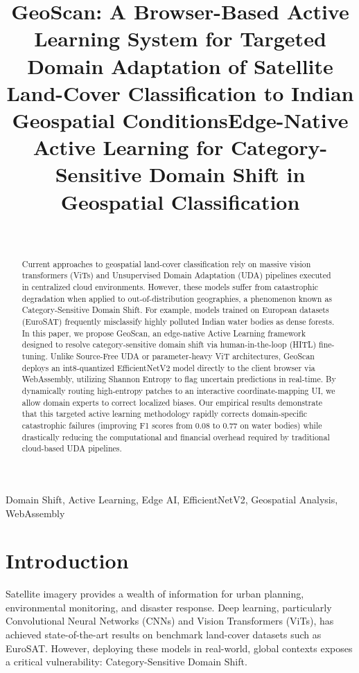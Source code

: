 \documentclass[journal]{IEEEtran}
\title{\textbf{GeoScan: A Browser-Based Active Learning System for Targeted Domain
Adaptation of Satellite Land-Cover Classification to Indian Geospatial
Conditions}}
\date{}
\begin{document}
\title{Edge-Native Active Learning for Category-Sensitive Domain Shift in Geospatial Classification}
\author{\\
}

\maketitle

\begin{abstract}
Current approaches to geospatial land-cover classification rely on massive vision transformers (ViTs) and Unsupervised Domain Adaptation (UDA) pipelines executed in centralized cloud environments. However, these models suffer from catastrophic degradation when applied to out-of-distribution geographies, a phenomenon known as Category-Sensitive Domain Shift. For example, models trained on European datasets (EuroSAT) frequently misclassify highly polluted Indian water bodies as dense forests. In this paper, we propose GeoScan, an edge-native Active Learning framework designed to resolve category-sensitive domain shift via human-in-the-loop (HITL) fine-tuning. Unlike Source-Free UDA or parameter-heavy ViT architectures, GeoScan deploys an int8-quantized EfficientNetV2 model directly to the client browser via WebAssembly, utilizing Shannon Entropy to flag uncertain predictions in real-time. By dynamically routing high-entropy patches to an interactive coordinate-mapping UI, we allow domain experts to correct localized biases. Our empirical results demonstrate that this targeted active learning methodology rapidly corrects domain-specific catastrophic failures (improving F1 scores from 0.08 to 0.77 on water bodies) while drastically reducing the computational and financial overhead required by traditional cloud-based UDA pipelines.
\end{abstract}

\begin{IEEEkeywords}
Domain Shift, Active Learning, Edge AI, EfficientNetV2, Geospatial Analysis, WebAssembly
\end{IEEEkeywords}

\section{Introduction}
Satellite imagery provides a wealth of information for urban planning, environmental monitoring, and disaster response. Deep learning, particularly Convolutional Neural Networks (CNNs) and Vision Transformers (ViTs), has achieved state-of-the-art results on benchmark land-cover datasets such as EuroSAT. However, deploying these models in real-world, global contexts exposes a critical vulnerability: Category-Sensitive Domain Shift. 
\end{document}
